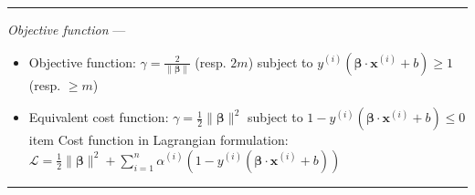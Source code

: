 {\color{lightgray}\hrule height 0.001mm}

\emph{Objective function} --- 
\begin{itemize}
    \item Objective function: $\gamma = \frac{2}{\| \boldsymbol{\beta} \|} $ (resp. $2m$) subject to $y^{(i)} (\boldsymbol{\beta} \cdot \boldsymbol{x}^{(i)} + b) \geq 1$ (resp. $\geq m$)
    \item Equivalent cost function: $\gamma = \frac{1}{2} \| \boldsymbol{\beta} \|^2 $ subject to $1 - y^{(i)} (\boldsymbol{\beta} \cdot \boldsymbol{x}^{(i)} + b) \leq 0$
    item Cost function in Lagrangian formulation: $\mathcal{L} = \frac{1}{2} \| \boldsymbol{\beta} \|^2 + \sum_{i=1}^n \alpha^{(i)} (1 - y^{(i)} (\boldsymbol{\beta} \cdot \boldsymbol{x}^{(i)} + b))$
\end{itemize}

{\color{lightgray}\hrule height 0.001mm}

